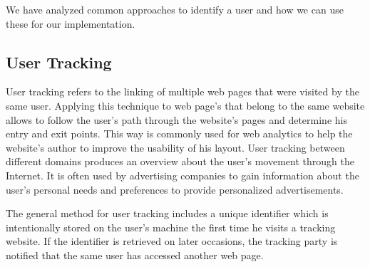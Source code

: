 	We have analyzed common approaches to identify a user and how we can use these for our implementation. %
	
\subsection{User Tracking}

	User tracking refers to the linking of multiple web pages that were visited by the same user. Applying this technique to web page's that belong to the same website allows to follow the user's path through the website's pages and determine his entry and exit points. This way is commonly used for web analytics to help the website's author to improve the usability of his layout. User tracking between different domains produces an overview about the user's movement through the Internet. It is often used by advertising companies to gain information about the user's personal needs and preferences to provide personalized advertisements. 
		
	The general method for user tracking includes a unique identifier which is intentionally stored on the user's machine the first time he visits a tracking website. If the identifier is retrieved on later occasions, the tracking party is notified that the same user has accessed another web page.  
	
%		
%		
	
